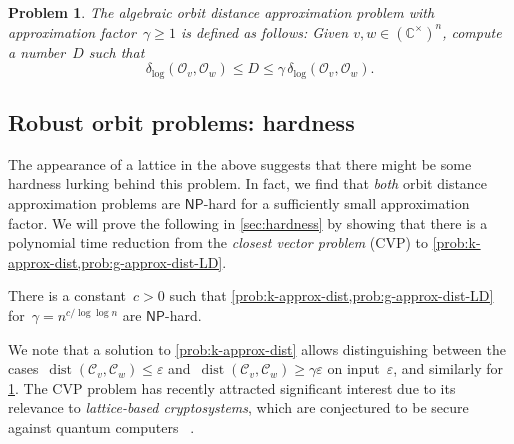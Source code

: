 \documentclass[a4paper,USenglish,cleveref,numberwithinsect]{lipics-v2021}
\newtheorem{problem}[theorem]{Problem}\crefname{problem}{Problem}{Problems}
\DeclareMathOperator{\dist}{dist}
\newcommand{\distLD}{\delta_{\log}}
\newcommand{\CC}{\mathbb{C}}
\newcommand{\OO}{\ensuremath{\mathcal{O}}}
\newcommand{\KK}{\ensuremath{\mathcal{C}}}
\newcommand{\NP}{\ensuremath{\mathsf{NP}}\xspace}
\numberwithin{equation}{section}
\begin{document}
\begin{problem}%
\label{prob:g-approx-dist-LD}
The \emph{algebraic orbit distance approximation problem} with approximation factor~$\gamma\geq1$ is defined as follows:
Given $v,w\in (\CC^\times)^n$, compute a number~$D$ such that
\[
 \distLD(\OO_v,\OO_w) \le D \le \gamma \, \distLD(\OO_v,\OO_w).
\]
\end{problem}

\subsection{Robust orbit problems: hardness}\label{subsec:intro hardness}
The appearance of a lattice in the above suggests that there might be some hardness lurking behind this problem.
In fact, we find that \emph{both} orbit distance approximation problems are \NP-hard for a sufficiently small approximation factor.
We will prove the following in \cref{sec:hardness} by showing that there is a polynomial time reduction from the \textit{closest vector problem} (CVP) to \cref{prob:k-approx-dist,prob:g-approx-dist-LD}.

\begin{theorem}\label{thm:intro-orbit-hardness}
There is a constant~$c>0$ such that \cref{prob:k-approx-dist,prob:g-approx-dist-LD}
for~$\gamma = n^{c/\log\log n}$ are \NP-hard.
\end{theorem}

We note that a solution to \cref{prob:k-approx-dist} allows distinguishing between
the cases~$\dist(\KK_v,\KK_w)\leq\varepsilon$
and~$\dist(\KK_v,\KK_w)\geq \gamma\varepsilon$ on input~$\varepsilon$,
and similarly for \cref{prob:g-approx-dist-LD}.
The CVP problem has recently attracted significant interest due to its relevance to \emph{lattice-based cryptosystems},
which are conjectured to be secure against quantum computers%
~\cite{ggh-crypto, ntru-crytpo-1, ntru-crypto-2, homomorphic-crypto}.
\end{document}
